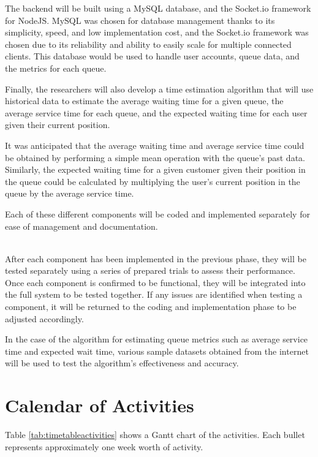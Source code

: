 The backend will be built using a MySQL database, and the Socket.io framework for NodeJS. MySQL was chosen for database management thanks to its simplicity, speed, and low implementation cost, and the Socket.io framework was chosen due to its reliability and ability to easily scale for multiple connected clients. This database would be used to handle user accounts, queue data, and the metrics for each queue.

Finally, the researchers will also develop a time estimation algorithm that will use historical data to estimate the average waiting time for a given queue, the average service time for each queue, and the expected waiting time for each user given their current position. 

It was anticipated that the average waiting time and average service time could be obtained by performing a simple mean operation with the queue’s past data. Similarly, the expected waiting time for a given customer given their position in the queue could be calculated by multiplying the user's current position in the queue by the average service time.

Each of these different components will be coded and implemented separately for ease of management and documentation.

 \\
After each component has been implemented in the previous phase, they will be tested separately using a series of prepared trials to assess their performance. Once each component is confirmed to be functional, they will be integrated into the full system to be tested together. If any issues are identified when testing a component, it will be returned to the coding and implementation phase to be adjusted accordingly.

In the case of the algorithm for estimating queue metrics such as average service time and expected wait time, various sample datasets obtained from the internet will be used to test the algorithm’s effectiveness and accuracy. 

\section{Calendar of Activities}

Table \ref{tab:timetableactivities} shows a Gantt chart of the activities. Each bullet represents approximately
one week worth of activity.

%
%
\newcommand{\weekone}{\textbullet}
\newcommand{\weektwo}{\textbullet \textbullet}
\newcommand{\weekthree}{\textbullet \textbullet \textbullet}
\newcommand{\weekfour}{\textbullet \textbullet \textbullet \textbullet}

